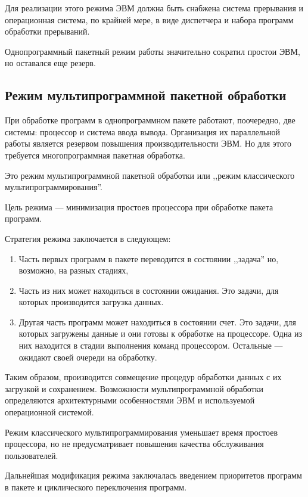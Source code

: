 \documentclass[a5paper, 10pt, notitlepage, pdftex,headsepline]{scrartcl}
\begin{document}
    Для реализации этого режима ЭВМ должна быть снабжена система
    прерывания и операционная система, по крайней мере, в виде
    диспетчера и набора программ обработки прерываний.

    Однопрограммный пакетный режим работы значительно сократил простои
    ЭВМ, но оставался еще резерв.
  \subsection{Режим мультипрограммной пакетной обработки}
    При обработке программ в однопрограммном пакете работают,
    поочередно, две системы: процессор и система ввода вывода.
    Организация их параллельной работы является резервом повышения
    производительности ЭВМ. Но для этого требуется многопрограммная
    пакетная обработка.

    Это режим мультипрограммной пакетной обработки или ,,режим
    классического мультипрограммирования''.

    Цель режима --- минимизация простоев процессора при обработке пакета
    программ.

    Стратегия режима заключается в следующем:
    \begin{enumerate}
      \item Часть первых программ в пакете переводится в состоянии
        ,,задача'' но, возможно, на разных стадиях,
      \item Часть из них может находиться в состоянии ожидания.
        Это задачи, для которых производится загрузка данных.
      \item Другая часть программ может находиться в состоянии счет.
        Это задачи, для которых загружены данные и они готовы к
        обработке на процессоре.
        Одна из них находится в стадии выполнения команд процессором.
        Остальные --- ожидают своей очереди на обработку.
    \end{enumerate}

    Таким образом, производится совмещение процедур обработки данных с
    их загрузкой и сохранением.
    Возможности мультипрограммной обработки определяются архитектурными
    особенностями ЭВМ и используемой операционной системой.

    Режим классического мультипрограммирования уменьшает время простоев
    процессора, но не предусматривает повышения качества обслуживания
    пользователей.

    Дальнейшая модификация режима заключалась введением приоритетов
    программ в пакете и циклического переключения программ.
\end{document}
